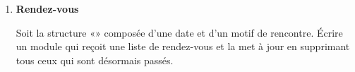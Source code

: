	
	\liststyleExercice
	\setcounter{saveenum}{\value{enumi}}
	\begin{enumerate}
	\setcounter{enumi}{\value{saveenum}}
	\item {\sffamily\bfseries
	Rendez-vous}
	
		Soit la structure «» composée d’une date
		et d’un motif de rencontre. Écrire un module qui reçoit une liste de
		rendez-vous et la met à jour en supprimant tous ceux qui sont désormais
		passés. 

	\end{enumerate}
